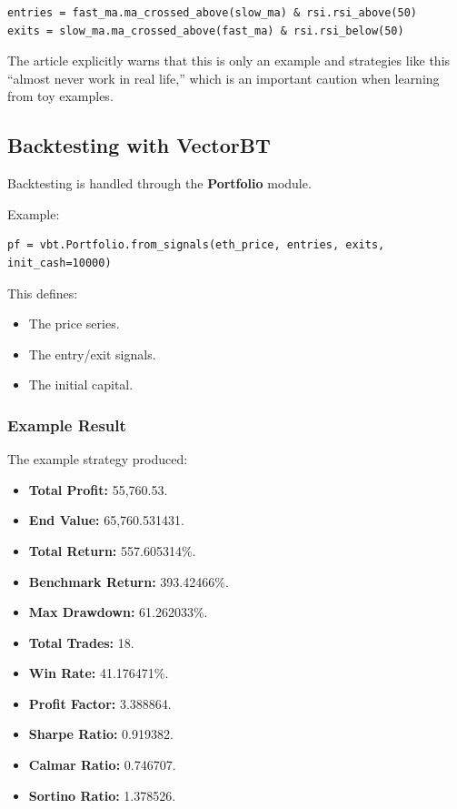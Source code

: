 \documentclass[12pt,openany]{book}
\begin{document}
\begin{Verbatim}[breaklines=true,breakanywhere=true,fontsize=\small]
entries = fast_ma.ma_crossed_above(slow_ma) & rsi.rsi_above(50)
exits = slow_ma.ma_crossed_above(fast_ma) & rsi.rsi_below(50)
\end{Verbatim}

The article explicitly warns that this is only an example and strategies like this ``almost never work in real life,'' which is an important caution when learning from toy examples.

\subsection{Backtesting with VectorBT}

Backtesting is handled through the \textbf{Portfolio} module.

Example:

\begin{Verbatim}[breaklines=true,breakanywhere=true,fontsize=\small]
pf = vbt.Portfolio.from_signals(eth_price, entries, exits, init_cash=10000)
\end{Verbatim}

This defines:

\begin{itemize}[leftmargin=*]
    \item The price series.
    \item The entry/exit signals.
    \item The initial capital.
\end{itemize}

\subsubsection{Example Result}

The example strategy produced:

\begin{itemize}[leftmargin=*]
    \item \textbf{Total Profit:} 55,760.53.
    \item \textbf{End Value:} 65,760.531431.
    \item \textbf{Total Return:} 557.605314\%.
    \item \textbf{Benchmark Return:} 393.42466\%.
    \item \textbf{Max Drawdown:} 61.262033\%.
    \item \textbf{Total Trades:} 18.
    \item \textbf{Win Rate:} 41.176471\%.
    \item \textbf{Profit Factor:} 3.388864.
    \item \textbf{Sharpe Ratio:} 0.919382.
    \item \textbf{Calmar Ratio:} 0.746707.
    \item \textbf{Sortino Ratio:} 1.378526.
\end{itemize}
\end{document}
